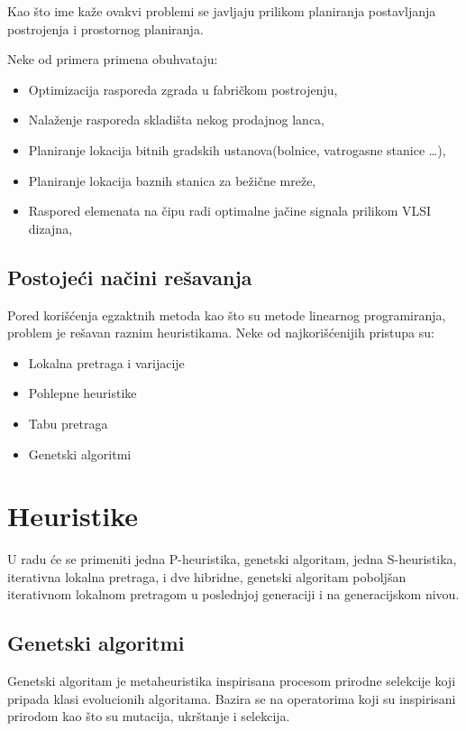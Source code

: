 \documentclass[a4paper]{article}
\begin{document}
Kao što ime kaže ovakvi problemi se javljaju prilikom planiranja postavljanja postrojenja i prostornog planiranja.

Neke od primera primena obuhvataju\cite{tokyo}:
\begin{itemize}
\item  Optimizacija rasporeda zgrada u fabričkom postrojenju,
\item Nalaženje rasporeda skladišta nekog prodajnog lanca,
\item Planiranje lokacija bitnih gradskih ustanova(bolnice, vatrogasne stanice \ldots),
\item Planiranje lokacija baznih stanica za bežične mreže,
\item Raspored elemenata na čipu radi optimalne jačine signala prilikom VLSI dizajna,
\end{itemize}

\subsection{Postojeći načini rešavanja}

Pored korišćenja egzaktnih metoda kao što su metode linearnog programiranja, problem je rešavan raznim heuristikama. Neke od najkorišćenijih pristupa su\cite{Silva}:
\begin{itemize}
\item Lokalna pretraga i varijacije
\item Pohlepne heuristike
\item Tabu pretraga
\item Genetski algoritmi
\end{itemize}


\section{Heuristike}
U radu će se primeniti jedna P-heuristika, genetski algoritam, jedna S-heuristika, iterativna lokalna pretraga, i dve hibridne, genetski algoritam poboljšan iterativnom lokalnom pretragom u poslednjoj generaciji i na generacijskom nivou.
\subsection{Genetski algoritmi}
Genetski algoritam je metaheuristika inspirisana procesom prirodne selekcije koji pripada klasi evolucionih algoritama. Bazira se na operatorima koji su inspirisani prirodom kao što su mutacija, ukrštanje i selekcija\cite{mitchellbook}.
\end{document}
